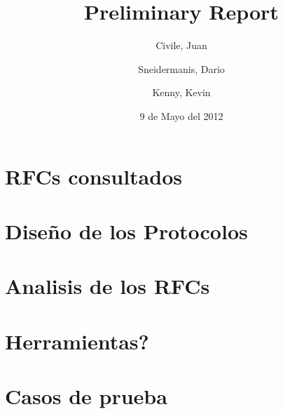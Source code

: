 \documentclass[11pt,a4paper,titlepage]{article}
\title{Preliminary Report}
\author{Civile, Juan \and Sneidermanis, Dario \and Kenny, Kevin}
\date{9 de Mayo del 2012}
\begin{document}
\maketitle
\tableofcontents
\clearpage

\section{RFCs consultados}

\section{Diseño de los Protocolos}

\section{Analisis de los RFCs}

\section{Herramientas?}

\section{Casos de prueba}
\end{document}
